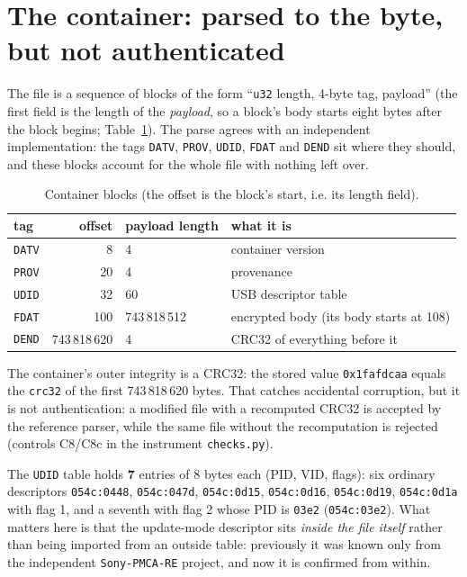 \documentclass[12pt]{article}
\newcommand{\code}[1]{\texttt{\small #1}}
\newcommand{\hx}[1]{\texttt{\footnotesize #1}}
\begin{document}
\section{The container: parsed to the byte, but not authenticated}
\label{sec:container}

The file is a sequence of blocks of the form ``\code{u32} length, 4-byte tag, payload''
(the first field is the length of the \emph{payload}, so a block's body starts eight bytes
after the block begins; Table~\ref{tab:container}). The parse agrees with an independent
implementation: the tags \code{DATV}, \code{PROV}, \code{UDID}, \code{FDAT} and \code{DEND}
sit where they should, and these blocks account for the whole file with nothing left over.

\begin{table}[htbp]\centering
\small
\caption{Container blocks (the offset is the block's start, i.e. its length field).}
\label{tab:container}
\begin{tabular}{lrll}
\toprule
tag & offset & payload length & what it is \\
\midrule
\code{DATV} & 8 & 4 & container version \\
\code{PROV} & 20 & 4 & provenance \\
\code{UDID} & 32 & 60 & USB descriptor table \\
\code{FDAT} & 100 & 743\,818\,512 & encrypted body (its body starts at 108) \\
\code{DEND} & 743\,818\,620 & 4 & CRC32 of everything before it \\
\bottomrule
\end{tabular}
\end{table}

The container's outer integrity is a CRC32: the stored value \hx{0x1fafdcaa} equals the
\code{crc32} of the first 743\,818\,620 bytes. That catches accidental corruption, but it is
not authentication: a modified file with a recomputed CRC32 is accepted by the reference
parser, while the same file without the recomputation is rejected (controls C8/C8c in the
instrument \code{checks.py}).

The \code{UDID} table holds \textbf{7} entries of 8 bytes each (PID, VID, flags): six ordinary
descriptors \code{054c:0448}, \code{054c:047d}, \code{054c:0d15}, \code{054c:0d16},
\code{054c:0d19}, \code{054c:0d1a} with flag 1, and a seventh with flag 2 whose PID is
\code{03e2} (\code{054c:03e2}). What matters here is that the update-mode descriptor sits
\emph{inside the file itself} rather than being imported from an outside table: previously it
was known only from the independent \code{Sony-PMCA-RE} project, and now it is confirmed from
within.
\end{document}
